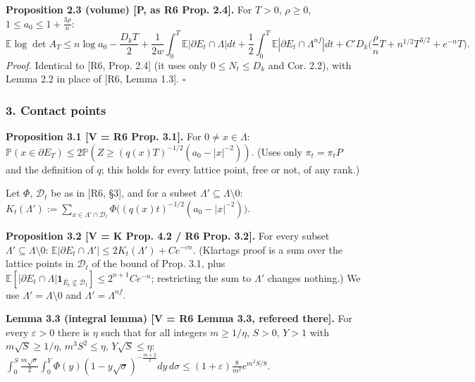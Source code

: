 \textbf{Proposition 2.3 (volume) {[}P, as R6 Prop. 2.4{]}.} For \(T>0\), \(\rho\ge0\), \(1\le a_0\le1+\frac{3\rho}n\):
\[\mathbb E\log\det A_T\le n\log a_0-\frac{D_kT}2+\frac1{2w}\int_0^T\mathbb E|\partial E_t\cap\Lambda|dt+\frac12\int_0^T\mathbb E|\partial E_t\cap\Lambda^{nf}|dt+C'D_k\Big(\frac\rho nT+n^{1/2}T^{3/2}+e^{-n}T\Big).\]
\emph{Proof.} Identical to {[}R6, Prop. 2.4{]} (it uses only \(0\le N_t\le D_k\) and Cor. 2.2), with Lemma 2.2 in place of {[}R6, Lemma 1.3{]}. \(\square\)

\hypertarget{contact-points}{%
\subsubsection*{3. Contact points}\label{contact-points}}

\textbf{Proposition 3.1 {[}V = R6 Prop. 3.1{]}.} For \(0\ne x\in\Lambda\): \(\mathbb P(x\in\partial E_T)\le2\mathbb P(Z\ge(q(x)T)^{-1/2}(a_0-|x|^{-2}))\). (Uses only \(\pi_t=\pi_tP\) and the definition of \(q\); this holds for every lattice point, free or not, of any rank.)

Let \(\Phi\), \(\mathcal D_t\) be as in {[}R6, §3{]}, and for a subset \(\Lambda'\subseteq\Lambda\setminus0\): \(K_t(\Lambda'):=\sum_{x\in\Lambda'\cap\mathcal D_t}\Phi\big((q(x)t)^{-1/2}(a_0-|x|^{-2})\big)\).

\textbf{Proposition 3.2 {[}V = K Prop. 4.2 / R6 Prop. 3.2{]}.} For every subset \(\Lambda'\subseteq\Lambda\setminus0\): \(\mathbb E|\partial E_t\cap\Lambda'|\le2K_t(\Lambda')+Ce^{-cn}\). (Klartag\textquotesingle s proof is a sum over the lattice points in \(\mathcal D_t\) of the bound of Prop. 3.1, plus \(\mathbb E[|\partial E_t\cap\Lambda|\mathbf 1_{\overline{E_t}\not\subseteq\mathcal D_t}]\le2^{n+1}Ce^{-n}\); restricting the sum to \(\Lambda'\) changes nothing.) We use \(\Lambda'=\Lambda\setminus0\) and \(\Lambda'=\Lambda^{nf}\).

\textbf{Lemma 3.3 (integral lemma) {[}V = R6 Lemma 3.3, refereed there{]}.} For every \(\varepsilon>0\) there is \(\eta\) such that for all integers \(m\ge1/\eta\), \(S>0\), \(Y>1\) with \(m\sqrt S\ge1/\eta\), \(m^3S^2\le\eta\), \(Y\sqrt S\le\eta\): \(\int_0^S\frac{m\sqrt\sigma}2\int_0^Y\Phi(y)(1-y\sqrt\sigma)^{-\frac{m+2}2}dy\,d\sigma\le(1+\varepsilon)\frac8{m^2}e^{m^2S/8}\).

